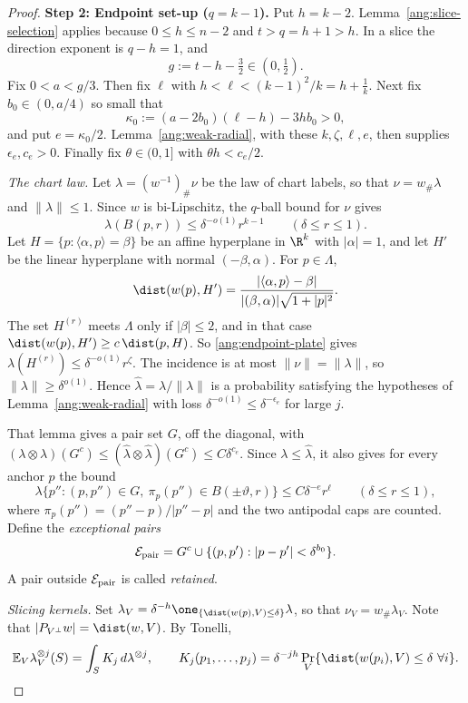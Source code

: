 \begin{proof}
\textbf{Step 2: Endpoint set-up ($q=k-1$).} Put $h=k-2$. Lemma~\ref{ang:slice-selection} applies because $0\le h\le n-2$ and $t>q=h+1>h$. In a slice the direction exponent is $q-h=1$, and
\[
 g:=t-h-\tfrac32\in(0,\tfrac12).
\]
Fix $0<a<g/3$. Then fix $\ell$ with $h<\ell<(k-1)^2/k=h+\frac1k$. Next fix $b_0\in(0,a/4)$ so small that
\[
 \kappa_0:=(a-2b_0)(\ell-h)-3hb_0>0,
\]
and put $e=\kappa_0/2$. Lemma~\ref{ang:weak-radial}, with these $k,\zeta,\ell,e$, then supplies $\epsilon_e,c_e>0$. Finally fix $\theta\in(0,1]$ with $\theta h<c_e/2$.

\emph{The chart law.} Let $\lambda=(w^{-1})_\#\nu$ be the law of chart labels, so that $\nu=w_\#\lambda$ and $\|\lambda\|\le1$. Since $w$ is bi-Lipschitz, the $q$-ball bound for $\nu$ gives
\begin{equation}\label{eq:lam-ball}
 \lambda(B(p,r))\le\delta^{-o(1)}r^{k-1}\qquad(\delta\le r\le1).
\end{equation}
Let $H=\{p:\langle\alpha,p\rangle=\beta\}$ be an affine hyperplane in $\R^k$ with $|\alpha|=1$, and let $H'$ be the linear hyperplane with normal $(-\beta,\alpha)$. For $p\in\Lambda$,
\[
 \dist(w(p),H')=\frac{|\langle\alpha,p\rangle-\beta|}{|(\beta,\alpha)|\sqrt{1+|p|^2}}.
\]
The set $H^{(r)}$ meets $\Lambda$ only if $|\beta|\le2$, and in that case $\dist(w(p),H')\ge c\,\dist(p,H)$. So \eqref{ang:endpoint-plate} gives $\lambda(H^{(r)})\le\delta^{-o(1)}r^\zeta$. The incidence is at most $\|\nu\|=\|\lambda\|$, so $\|\lambda\|\ge\delta^{o(1)}$. Hence $\hat\lambda=\lambda/\|\lambda\|$ is a probability satisfying the hypotheses of Lemma~\ref{ang:weak-radial} with loss $\delta^{-o(1)}\le\delta^{-\epsilon_e}$ for large $j$.

That lemma gives a pair set $G$, off the diagonal, with $(\lambda\otimes\lambda)(G^c)\le(\hat\lambda\otimes\hat\lambda)(G^c)\le C\delta^{c_e}$. Since $\lambda\le\hat\lambda$, it also gives for every anchor $p$ the bound
\begin{equation}\label{eq:radial}
 \lambda\{p'':(p,p'')\in G,\ \pi_p(p'')\in B(\pm\vartheta,r)\}\le C\delta^{-e}r^\ell
 \qquad(\delta\le r\le1),
\end{equation}
where $\pi_p(p'')=(p''-p)/|p''-p|$ and the two antipodal caps are counted. Define the \emph{exceptional pairs}
\[
 \mathcal E_{\rm pair}=G^c\cup\{(p,p'):|p-p'|<\delta^{b_0}\}.
\]
A pair outside $\mathcal E_{\rm pair}$ is called \emph{retained}.

\emph{Slicing kernels.} Set $\lambda_V=\delta^{-h}\one_{\{\dist(w(p),V)\le\delta\}}\lambda$, so that $\nu_V=w_\#\lambda_V$. Note that $|P_{V^\perp}w|=\dist(w,V)$. By Tonelli,
\[
 \mathbb E_V\lambda_V^{\otimes j}(S)=\int_S K_j\,d\lambda^{\otimes j},\qquad
 K_j(p_1,\dots,p_j)=\delta^{-jh}\Pr_V\{\dist(w(p_i),V)\le\delta\ \forall i\}.
\]


\end{proof}

